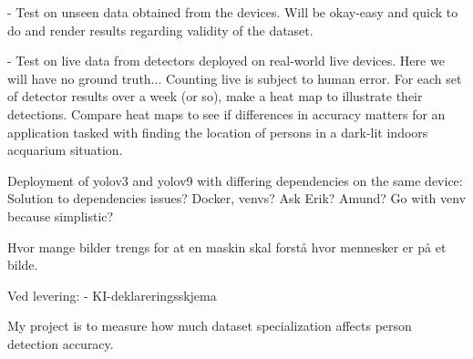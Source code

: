 - Test on unseen data obtained from the devices.
	Will be okay-easy and quick to do and render results regarding validity of the dataset.

- Test on live data from detectors deployed on real-world live devices.
	Here we will have no ground truth... Counting live is subject to human error. 
	For each set of detector results over a week (or so), make a heat map to illustrate their detections. 
	Compare heat maps to see if differences in accuracy matters for an application tasked with finding the location of persons in a dark-lit indoors acquarium situation.

	Deployment of yolov3 and yolov9 with differing dependencies on the same device:
	Solution to dependencies issues? Docker, venvs?	Ask Erik? Amund? Go with venv because simplistic?

Hvor mange bilder trengs for at en maskin skal forstå hvor mennesker er på et bilde.



Ved levering:
- KI-deklareringsskjema





My project is to measure how much dataset specialization affects person detection accuracy.
